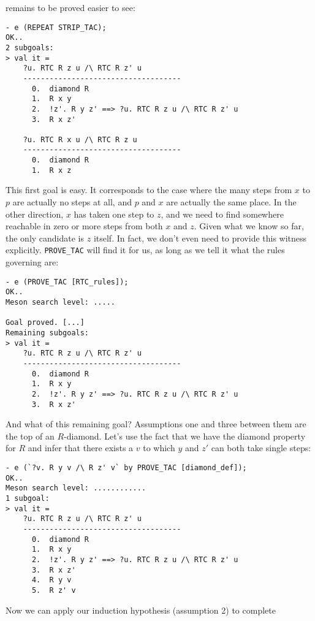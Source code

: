 \documentclass[12pt]{article}
\begin{document}
remains to be proved easier to see:
\begin{session}\begin{verbatim}
- e (REPEAT STRIP_TAC);
OK..
2 subgoals:
> val it =
    ?u. RTC R z u /\ RTC R z' u
    ------------------------------------
      0.  diamond R
      1.  R x y
      2.  !z'. R y z' ==> ?u. RTC R z u /\ RTC R z' u
      3.  R x z'

    ?u. RTC R x u /\ RTC R z u
    ------------------------------------
      0.  diamond R
      1.  R x z
\end{verbatim}\end{session}
This first goal is easy.  It corresponds to the case where the many
steps from $x$ to $p$ are actually no steps at all, and $p$ and $x$
are actually the same place.  In the other direction, $x$ has taken
one step to $z$, and we need to find somewhere reachable in zero or
more steps from both $x$ and $z$.  Given what we know so far, the only
candidate is $z$ itself.  In fact, we don't even need to provide this
witness explicitly. \texttt{PROVE\_TAC} will find it for us, as long
as we tell it what the rules governing  are:
\begin{session}\begin{verbatim}
- e (PROVE_TAC [RTC_rules]);
OK..
Meson search level: .....

Goal proved. [...]
Remaining subgoals:
> val it =
    ?u. RTC R z u /\ RTC R z' u
    ------------------------------------
      0.  diamond R
      1.  R x y
      2.  !z'. R y z' ==> ?u. RTC R z u /\ RTC R z' u
      3.  R x z'
\end{verbatim}\end{session}
    And what of this remaining goal?  Assumptions one and three
    between them are the top of an $R$-diamond.  Let's use the fact
    that we have the diamond property for $R$ and infer that there
    exists a $v$ to which $y$ and $z'$ can both take single steps:
\begin{session}\begin{verbatim}
- e (`?v. R y v /\ R z' v` by PROVE_TAC [diamond_def]);
OK..
Meson search level: ............
1 subgoal:
> val it =
    ?u. RTC R z u /\ RTC R z' u
    ------------------------------------
      0.  diamond R
      1.  R x y
      2.  !z'. R y z' ==> ?u. RTC R z u /\ RTC R z' u
      3.  R x z'
      4.  R y v
      5.  R z' v
\end{verbatim}\end{session}
Now we can apply our induction hypothesis (assumption 2) to complete
\end{document}
